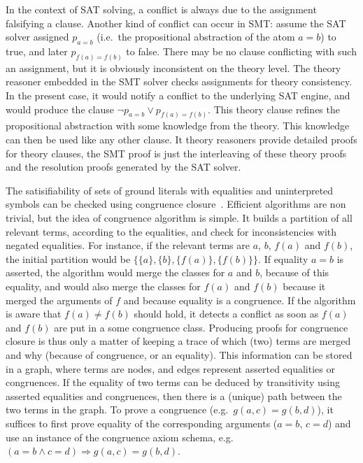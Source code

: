 \documentclass{llncs}
\begin{document}
In the context of SAT solving, a conflict is always due to the assignment
falsifying a clause.  Another kind of conflict can occur in SMT: assume the SAT
solver assigned $p_{a=b}$ (i.e.\ the propositional abstraction of the atom
$a=b$) to true, and later $p_{f(a) = f(b)}$ to false.  There may be no clause
conflicting with such an assignment, but it is obviously inconsistent on the
theory level.  The theory reasoner embedded in the SMT solver checks assignments
for theory consistency.  In the present case, it would notify a conflict to the
underlying SAT engine, and would produce the clause $\neg p_{a=b} \vee p_{f(a) =
  f(b)}$.  This theory clause refines the propositional abstraction with some
knowledge from the theory.  This knowledge can then be used like any other
clause.  It theory reasoners provide detailed proofs for theory clauses, the SMT
proof is just the interleaving of these theory proofs and the resolution proofs
generated by the SAT solver.

The satisifiability of sets of ground literals with equalities and uninterpreted
symbols can be checked using congruence closure~\cite{Nelson2,Nieuwenhuis6}.
Efficient algorithms are non trivial, but the idea of congruence algorithm is
simple.  It builds a partition of all relevant terms, according to the
equalities, and check for inconsistencies with negated equalities.  For
instance, if the relevant terms are $a$, $b$, $f(a)$ and $f(b)$, the initial
partition would be $\big\{\{a\}, \{b\}, \{f(a)\}, \{f(b)\}\big\}$.  If equality
$a=b$ is asserted, the algorithm would merge the classes for $a$ and $b$,
because of this equality, and would also merge the classes for $f(a)$ and $f(b)$
because it merged the arguments of $f$ and because equality is a congruence.  If
the algorithm is aware that $f(a) \neq f(b)$ should hold, it detects a conflict
as soon as $f(a)$ and $f(b)$ are put in a some congruence class.  Producing
proofs for congruence closure is thus only a matter of keeping a trace of which
(two) terms are merged and why (because of congruence, or an equality).  This
information can be stored in a graph, where terms are nodes, and edges represent
asserted equalities or congruences.  If the equality of two terms can be deduced
by transitivity using asserted equalities and congruences, then there is a
(unique) path between the two terms in the graph.  To prove a congruence
(e.g.\ $g(a,c) = g(b,d)$), it suffices to first prove equality of the
corresponding arguments ($a=b$, $c=d$) and use an instance of the congruence
axiom schema, e.g.\ $(a=b \wedge c=d) \Rightarrow g(a,c) = g(b,d)$.
\end{document}
